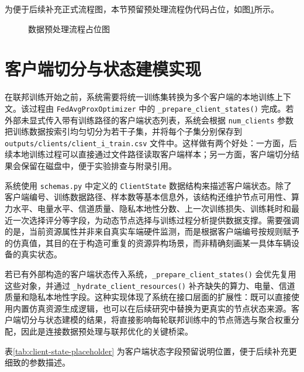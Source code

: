为便于后续补充正式流程图，本节预留预处理流程伪代码占位，如图\ref{fig:preprocess-placeholder}所示。

\begin{figure}[htbp]
    \centering
    \caption{数据预处理流程占位图}
    \label{fig:preprocess-placeholder}
\end{figure}

\section{客户端切分与状态建模实现}
\label{sec:implementation-client-split}

在联邦训练开始之前，系统需要将统一训练集转换为多个客户端的本地训练上下文。该过程由 \texttt{FedAvgProxOptimizer} 中的 \texttt{\_prepare\_client\_states()} 完成。若外部未显式传入带有训练路径的客户端状态列表，系统会根据 \texttt{num\_clients} 参数把训练数据按索引均匀切分为若干子集，并将每个子集分别保存到 \texttt{outputs/clients/client\_i\_train.csv} 文件中。这样做有两个好处：一方面，后续本地训练过程可以直接通过文件路径读取客户端样本；另一方面，客户端切分结果会保留在磁盘中，便于实验排查与附录引用。

系统使用 \texttt{schemas.py} 中定义的 \texttt{ClientState} 数据结构来描述客户端状态。除了客户端编号、训练数据路径、样本数等基本信息外，该结构还维护节点可用性、算力水平、电量水平、信道质量、隐私本地性分数、上一次训练损失、训练耗时和最近一次选择评分等字段，为动态节点选择与训练过程分析提供数据支撑。需要强调的是，当前资源属性并非来自真实车端硬件监测，而是根据客户端编号按规则赋予的仿真值，其目的在于构造可重复的资源异构场景，而非精确刻画某一具体车辆设备的真实状态。

若已有外部构造的客户端状态传入系统，\texttt{\_prepare\_client\_states()} 会优先复用这些对象，并通过 \texttt{\_hydrate\_client\_resources()} 补齐缺失的算力、电量、信道质量和隐私本地性字段。这种实现体现了系统在接口层面的扩展性：既可以直接使用内置仿真资源生成逻辑，也可以在后续研究中替换为更真实的节点状态来源。客户端切分与状态建模的结果，将直接影响每轮联邦训练中的节点筛选与聚合权重分配，因此是连接数据预处理与联邦优化的关键桥梁。

表\ref{tab:client-state-placeholder} 为客户端状态字段预留说明位置，便于后续补充更细致的参数描述。

